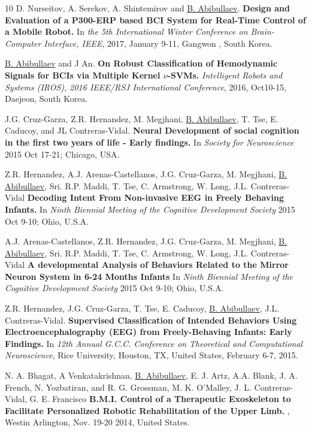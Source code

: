 \documentclass[10pt,letterpaper,sans]{moderncv}   %
\begin{document}
\begin{thebibliography}{10}
\small
{}
D. Nurseitov, A. Serekov, A. Shintemirov and \underline{B. Abibullaev}.
\newblock \textbf{Design and Evaluation of a {P300}-{ERP} based {BCI} System for Real-Time Control of a Mobile Robot.} \newblock In \textit{the 5th International Winter Conference on Brain-Computer Interface, IEEE}, 2017, January 9-11, Gangwon , South Korea.

\small
{}
\underline{B. Abibullaev} and J An. 
\newblock \textbf{On Robust Classification of Hemodynamic Signals for {BCI}s via Multiple Kernel $\nu$-SVMs.}
\newblock \textit{Intelligent Robots and Systems (IROS), 2016 IEEE/RSJ International Conference}, 2016, Oct10-15, Daejeon, South Korea.

\small
{}
J.G. Cruz-Garza, Z.R. Hernandez, M. Megjhani, \underline{B. Abibullaev}, T. Tse, E. Caducoy, and JL Contreras-Vidal.
\newblock \textbf{Neural Development of social cognition in the first two years of life - Early findings.}
\newblock In {\em Society for Neuroscience} 2015 Oct 17-21; Chicago, USA.

Z.R. Hernandez, A.J. Arenas-Castellanos, J.G. Cruz-Garza, M. Megjhani, \underline{B. Abibullaev}, Sri. R.P. Maddi, T. Tse,  C. Armstrong, W. Long, J.L. Contreras-Vidal
\newblock \textbf{Decoding Intent From Non-invasive {EEG} in Freely Behaving Infants.}
\newblock In {\em Ninth Biennial Meeting of the Cognitive Development Society} 2015 Oct 9-10; Ohio, U.S.A.

A.J. Arenas-Castellanos, Z.R. Hernandez, J.G. Cruz-Garza, M. Megjhani, \underline{B. Abibullaev}, Sri. R.P. Maddi, T. Tse,  C. Armstrong, W. Long, J.L. Contreras-Vidal
\newblock \textbf{A developmental Analysis of Behaviors Related to the Mirror Neuron System in 6-24 Months Infants}
\newblock In {\em Ninth Biennial Meeting of the Cognitive Development Society} 2015 Oct 9-10; Ohio, U.S.A.

Z.R. Hernandez, J.G. Cruz-Garza, T. Tse, E. Caducoy, \underline{B. Abibullaev}, J.L. Contreras-Vidal.
\newblock \textbf{Supervised Classification of Intended Behaviors Using Electroencephalography ({EEG}) from Freely-Behaving Infants: Early Findings.}
\newblock In {\em 12th Annual G.C.C. Conference on Theoretical and Computational Neuroscience}, Rice University, Houston, TX, United States, February 6-7, 2015.

N. A. Bhagat, A Venkatakrishnan, \underline{B. Abibullaev}, E. J. Artz, A.A. Blank, J. A. French, N. Yozbatiran, and R. G. Grossman, M. K. O'Malley, J. L. Contreras-Vidal, G. E. Francisco
\newblock \textbf{{B.M.I.} Control of a Therapeutic Exoskeleton to Facilitate Personalized Robotic Rehabilitation of the Upper Limb.} 
, Westin Arlington, Nov. 19-20 2014, United States.  


\end{thebibliography}
\end{document}
